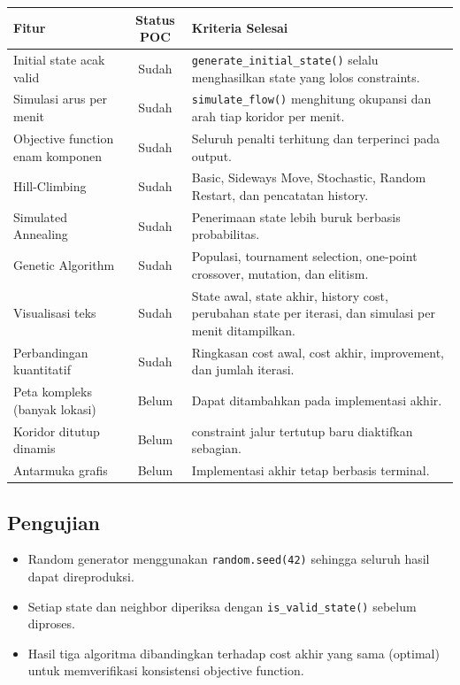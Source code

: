 \documentclass[11pt,a4paper]{article}
\begin{document}
\begin{tabularx}{\textwidth}{|>{\raggedright\arraybackslash}p{3.4cm}|c|>{\raggedright\arraybackslash}X|}
\hline
\textbf{Fitur} & \textbf{Status POC} & \textbf{Kriteria Selesai} \\
\hline
Initial state acak valid & Sudah & \texttt{generate\_initial\_state()} selalu menghasilkan state yang lolos constraints. \\
\hline
Simulasi arus per menit & Sudah & \texttt{simulate\_flow()} menghitung okupansi dan arah tiap koridor per menit. \\
\hline
Objective function enam komponen & Sudah & Seluruh penalti terhitung dan terperinci pada output. \\
\hline
Hill-Climbing & Sudah & Basic, Sideways Move, Stochastic, Random Restart, dan pencatatan history. \\
\hline
Simulated Annealing & Sudah & Penerimaan state lebih buruk berbasis probabilitas. \\
\hline
Genetic Algorithm & Sudah & Populasi, tournament selection, one-point crossover, mutation, dan elitism. \\
\hline
Visualisasi teks & Sudah & State awal, state akhir, history cost, perubahan state per iterasi, dan simulasi per menit ditampilkan. \\
\hline
Perbandingan kuantitatif & Sudah & Ringkasan cost awal, cost akhir, improvement, dan jumlah iterasi. \\
\hline
Peta kompleks (banyak lokasi) & Belum & Dapat ditambahkan pada implementasi akhir. \\
\hline
Koridor ditutup dinamis & Belum & constraint jalur tertutup baru diaktifkan sebagian. \\
\hline
Antarmuka grafis & Belum & Implementasi akhir tetap berbasis terminal. \\
\hline
\end{tabularx}

\subsection{Pengujian}

\begin{itemize}[leftmargin=2em,itemsep=0.1em]
  \item Random generator menggunakan \texttt{random.seed(42)} sehingga seluruh hasil dapat direproduksi.
  \item Setiap state dan neighbor diperiksa dengan \texttt{is\_valid\_state()} sebelum diproses.
  \item Hasil tiga algoritma dibandingkan terhadap cost akhir yang sama (optimal) untuk memverifikasi konsistensi objective function.
\end{itemize}
\end{document}
